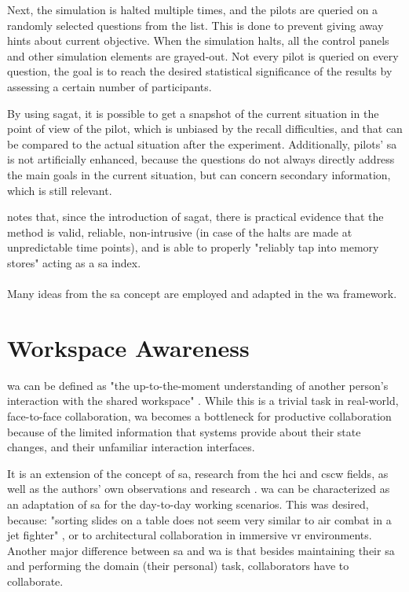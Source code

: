 Next, the simulation is halted multiple times, and the pilots are queried on a randomly selected questions from the list. This is done to prevent giving away hints about current objective. When the simulation halts, all the control panels and other simulation elements are grayed-out. Not every pilot is queried on every question, the goal is to reach the desired statistical significance of the results by assessing a certain number of participants.

By using \gls{sagat}, it is possible to get a snapshot of the current situation in the point of view of the pilot, which is unbiased by the recall difficulties, and that can be compared to the actual situation after the experiment. Additionally, pilots' \gls{sa} is not artificially enhanced, because the questions do not always directly address the main goals in the current situation, but can concern secondary information, which is still relevant.

\parencite{endsley_direct_nodate} notes that, since the introduction of \gls{sagat}, there is practical evidence that the method is valid, reliable, non-intrusive (in case of the halts are made at unpredictable time points), and is able to properly "reliably tap into memory stores" acting as a \gls{sa} index. 


\paragraph[Bridge]{}
Many ideas from the \gls{sa} concept are employed and adapted in the \gls{wa} framework.


\section{Workspace Awareness}
\gls{wa} can be defined as "the up-to-the-moment understanding of another person’s interaction with the shared workspace" \parencite{gutwin_descriptive_2002}. While this is a trivial task in real-world, face-to-face collaboration, \gls{wa} becomes a bottleneck for productive collaboration because of the limited information that systems provide about their state changes, and their unfamiliar interaction interfaces.
 
It is an extension of the concept of \gls{sa}, research from the \gls{hci} and \gls{cscw} fields, as well as the authors' own observations and research \parencite{gutwin_descriptive_2002}. \gls{wa} can be characterized as an adaptation of \gls{sa} for the day-to-day working scenarios. This was desired, because: "sorting slides on a table does not seem very similar to air combat in a jet fighter" \parencite{gutwin_descriptive_2002}, or to architectural collaboration in immersive \gls{vr} environments. Another major difference between \gls{sa} and \gls{wa} is that besides maintaining their \gls{sa} and performing the domain (their personal) task, collaborators have to collaborate.

